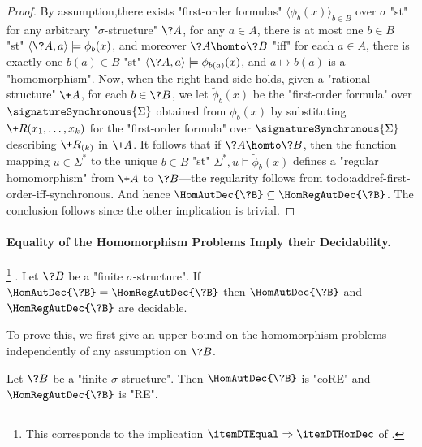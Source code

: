 \begin{proof}
	By assumption,there exists "first-order formulas"
	$\langle \phi_b(x) \rangle_{b\in B}$ over $\sigma$ "st" for any
	arbitrary "$\sigma$-structure" $\?A$, for any $a\in A$,
	there is at most one $b \in B$ "st" $\langle \?A, a \rangle \models \phi_b(x)$, and moreover $\?A \homto \?B$
	"iff" for each $a\in A$, there is exactly one $b(a) \in B$ "st" $\langle \?A, a \rangle \models \phi_{b(a)}(x)$, and $a \mapsto b(a)$ is a "homomorphism".
	Now, when the right-hand side holds, given a "rational structure" $\+A$,
	for each $b\in \?B$, we let $\tilde\phi_b(x)$ be the "first-order formula" over $\signatureSynchronous{\Sigma}$ obtained from $\phi_b(x)$
	by substituting $\+R(x_1,\hdots,x_k)$ for the "first-order formula"
	over $\signatureSynchronous{\Sigma}$ describing $\+R_{(k)}$ in $\+A$.
	It follows that if $\?A \homto \?B$, then the function
	mapping $u \in \Sigma^*$ to the unique $b \in B$ "st" $\Sigma^*, u \models \tilde\phi_b(x)$
	defines a "regular homomorphism" from $\+A$ to $\?B$---the regularity follows from
	todo:addref-first-order-iff-synchronous.
	And hence $\HomAutDec{\?B} \subseteq \HomRegAutDec{\?B}$. The conclusion follows since
	the other implication is trivial.
\end{proof}

\paragraph*{Equality of the Homomorphism Problems Imply their Decidability.}

\begin{proposition}
	\!\footnote{This corresponds to the implication $\itemDTEqual \Rightarrow \itemDTHomDec$
	of .}
	\AP\label{prop:dichotomy-Equal-implies-HomDec}.
	Let $\?B$ be a "finite $\sigma$-structure".
	If $\HomAutDec{\?B} = \HomRegAutDec{\?B}$ then $\HomAutDec{\?B}$ and $\HomRegAutDec{\?B}$
	are decidable.
\end{proposition}

To prove this, we first give an upper bound on the homomorphism problems independently
of any assumption on $\?B$.
\begin{proposition}
	\AP\label{prop:dichotomy-general-upper-bounds}
	Let $\?B$ be a "finite $\sigma$-structure".
	Then $\HomAutDec{\?B}$ is "coRE" and $\HomRegAutDec{\?B}$ is "RE".
\end{proposition}

